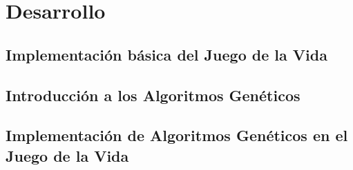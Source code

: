 \section{Desarrollo}
\subsection{Implementación básica del Juego de la Vida}



\subsection{Introducción a los Algoritmos Genéticos}



\subsection{Implementación de Algoritmos Genéticos en el Juego de la Vida}

